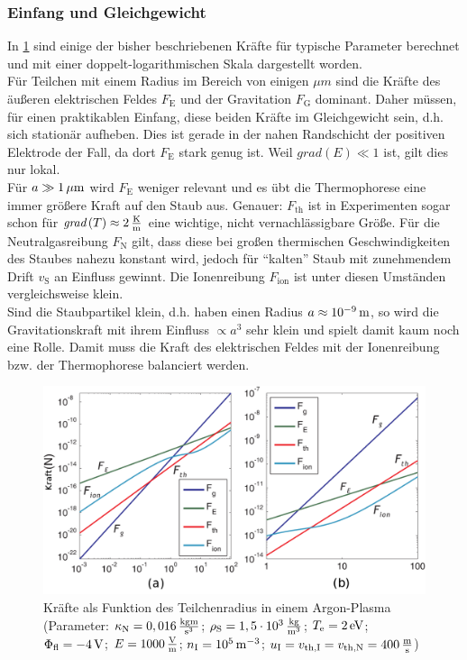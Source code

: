\documentclass[numbers=noenddot,a4paper]{scrartcl}
\newcommand{\tenpo}[1]{ 10^{#1}}
\newcommand{\ix}[1]{_\text{#1}}
\newcommand{\grad}[1]{\textit{grad}\left(#1\right)}
\begin{document}
			\subsubsection{Einfang und Gleichgewicht}
			
				In \ref{img:kräfte} sind einige der bisher beschriebenen Kräfte für typische Parameter berechnet und mit einer doppelt-logarithmischen Skala dargestellt worden.\\
				Für Teilchen mit einem Radius im Bereich von einigen $\unit{\mu m}$ sind die Kräfte des äußeren elektrischen Feldes $F\ix{E}$ und der Gravitation $F\ix{G}$ dominant. Daher müssen, für einen praktikablen Einfang, diese beiden Kräfte im Gleichgewicht sein, d.h. sich stationär aufheben. Dies ist gerade in der nahen Randschicht der positiven Elektrode der Fall, da dort $F\ix{E}$ stark genug ist. Weil $\grad{E}\ll1$ ist, gilt dies nur lokal.\\
				Für $a\gg\unit[1]{\mu m}$ wird $F\ix{E}$ weniger relevant und es übt die Thermophorese eine immer größere Kraft auf den Staub aus. Genauer: $F\ix{th}$ ist in Experimenten sogar schon für $\grad{T}\approx \unit[2]{\frac{K}{m}}$ eine wichtige, nicht vernachlässigbare Größe. Für die Neutralgasreibung $F\ix{N}$ gilt, dass diese bei großen thermischen Geschwindigkeiten des Staubes nahezu konstant wird, jedoch für "`kalten"' Staub mit zunehmendem Drift $v\ix{S}$ an Einfluss gewinnt. Die Ionenreibung $F\ix{ion}$ ist unter diesen Umständen vergleichsweise klein.\\
				Sind die Staubpartikel klein, d.h. haben einen Radius $a\approx\unit[\tenpo{-9}]{m}$, so wird die Gravitationskraft mit ihrem Einfluss $\propto a^3$ sehr klein und spielt damit kaum noch eine Rolle. Damit muss die Kraft des elektrischen Feldes mit der Ionenreibung bzw. der Thermophorese balanciert werden.		
						
					\begin{figure}
						\centering
						\includegraphics[width=1\textwidth,height=0.5\textwidth]{figs/allforcesequlibriummelzer.png}
						\caption{Kräfte als Funktion des Teilchenradius in einem Argon-Plasma (Parameter: $\kappa\ix{N}=\unit[0,016]{\frac{kg m}{s^3}}$;  \mbox{$\rho\ix{S}=\unit[1,5\cdot\tenpo{3}]{\frac{kg}{m^3}}$}; $T\ix{e}=\unit[2]{eV}$; $\Phi\ix{fl}=\unit[-4]{V}$; $E=\unit[1000]{\frac{V}{m}}$; $n\ix{I}=\unit[\tenpo{5}]{m^{-3}}$; $u\ix{I}=v\ix{th,I}=v\ix{th,N}=\unit[400]{\frac{m}{s}}$)} \label{img:kräfte}
					\end{figure}
				
\end{document}
